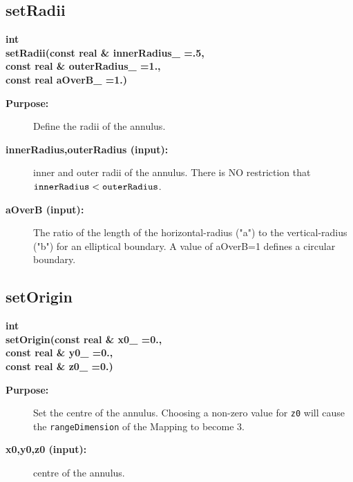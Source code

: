 \subsection{setRadii}
 
\begin{flushleft} \textbf{%
int  \\ 
\settowidth{\AnnulusMappingIncludeArgIndent}{setRadii(}%
setRadii(const real \& innerRadius\_  =.5, \\ 
\hspace{\AnnulusMappingIncludeArgIndent}const real \& outerRadius\_  =1.,\\ 
\hspace{\AnnulusMappingIncludeArgIndent}const real aOverB\_  =1.)
}\end{flushleft}
\begin{description}
\item[{\bf Purpose:}]  Define the radii of the annulus.
\item[{\bf innerRadius,outerRadius (input):}]  inner and outer radii of the annulus.
    There is NO restriction that ${\tt innerRadius} < {\tt outerRadius}$.
\item[{\bf aOverB (input):}]  The ratio of the length of the horizontal-radius ("a") to the vertical-radius ("b")
  for an elliptical boundary. A value of aOverB=1 defines a circular boundary. 
\end{description}
\subsection{setOrigin}
 
\begin{flushleft} \textbf{%
int  \\ 
\settowidth{\AnnulusMappingIncludeArgIndent}{setOrigin(}%
setOrigin(const real \& x0\_  =0., \\ 
\hspace{\AnnulusMappingIncludeArgIndent}const real \& y0\_  =0., \\ 
\hspace{\AnnulusMappingIncludeArgIndent}const real \& z0\_  =0.)
}\end{flushleft}
\begin{description}
\item[{\bf Purpose:}]  Set the centre of the annulus. Choosing a non-zero value for
  {\tt z0} will cause the {\tt rangeDimension} of the Mapping to become 3.
  
\item[{\bf x0,y0,z0 (input):}]  centre of the annulus.
\end{description}
